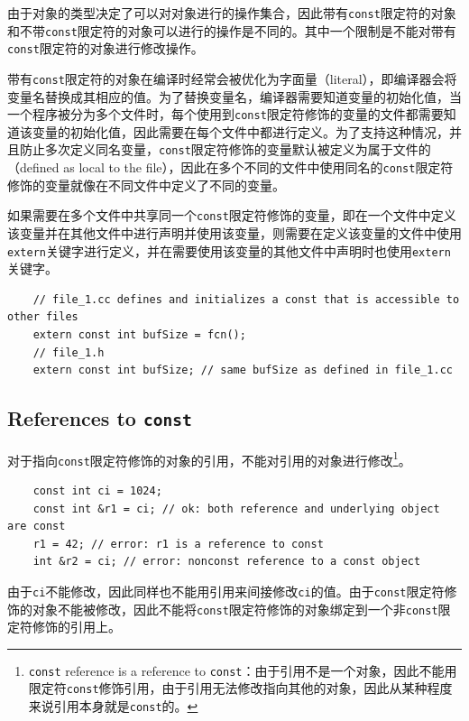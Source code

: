 由于对象的类型决定了可以对对象进行的操作集合，因此带有\texttt{const}限定符的对象和不带\texttt{const}限定符的对象可以进行的操作是不同的。其中一个限制是不能对带有\texttt{const}限定符的对象进行修改操作。

带有\texttt{const}限定符的对象在编译时经常会被优化为字面量（literal），即编译器会将变量名替换成其相应的值。为了替换变量名，编译器需要知道变量的初始化值，当一个程序被分为多个文件时，每个使用到\texttt{const}限定符修饰的变量的文件都需要知道该变量的初始化值，因此需要在每个文件中都进行定义。为了支持这种情况，并且防止多次定义同名变量，\texttt{const}限定符修饰的变量默认被定义为属于文件的（defined as local to the file），因此在多个不同的文件中使用同名的\texttt{const}限定符修饰的变量就像在不同文件中定义了不同的变量。

如果需要在多个文件中共享同一个\texttt{const}限定符修饰的变量，即在一个文件中定义该变量并在其他文件中进行声明并使用该变量，则需要在定义该变量的文件中使用\texttt{extern}关键字进行定义，并在需要使用该变量的其他文件中声明时也使用\texttt{extern}关键字。

\begin{verbatim}
    // file_1.cc defines and initializes a const that is accessible to other files
    extern const int bufSize = fcn();
    // file_1.h
    extern const int bufSize; // same bufSize as defined in file_1.cc
\end{verbatim}

\subsection{References to \texttt{const}}\label{sec:cpp-const-reference}
对于指向\texttt{const}限定符修饰的对象的引用，不能对引用的对象进行修改\footnote{\texttt{const} reference is a reference to \texttt{const}：由于引用不是一个对象，因此不能用限定符\texttt{const}修饰引用，由于引用无法修改指向其他的对象，因此从某种程度来说引用本身就是\texttt{const}的。}。

\begin{verbatim}
    const int ci = 1024;
    const int &r1 = ci; // ok: both reference and underlying object are const
    r1 = 42; // error: r1 is a reference to const
    int &r2 = ci; // error: nonconst reference to a const object
\end{verbatim}

由于\texttt{ci}不能修改，因此同样也不能用引用来间接修改\texttt{ci}的值。由于\texttt{const}限定符修饰的对象不能被修改，因此不能将\texttt{const}限定符修饰的对象绑定到一个非\texttt{const}限定符修饰的引用上。

